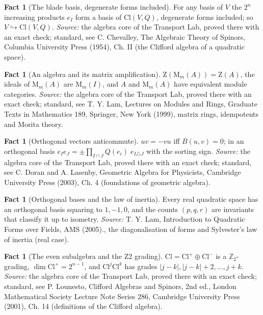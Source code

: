 \documentclass[11pt]{article}
\theoremstyle{definition}
\newtheorem{fact}[theorem]{Fact}
\theoremstyle{plain}
\providecommand{\Cl}{}\renewcommand{\Cl}{\mathrm{Cl}}
\providecommand{\Mat}{}\renewcommand{\Mat}{\mathrm{M}}
\providecommand{\Zc}{}\renewcommand{\Zc}{\mathrm{Z}}
\begin{document}
\begin{fact}[The blade basis, degenerate forms included]\label{c:std-algebra.blade-basis}
For any basis of $V$ the $2^{n}$ increasing products $e_I$ form a basis of $\Cl(V, Q)$, degenerate forms included; so $V \hookrightarrow \Cl(V, Q)$.
\emph{Source:} the algebra core of the Transport Lab, proved there with an exact check; standard, see C. Chevalley, The Algebraic Theory of Spinors, Columbia University Press (1954), Ch. II (the Clifford algebra of a quadratic space).
\end{fact}

\begin{fact}[An algebra and its matrix amplification]\label{c:std-algebra.morita-amplification}
$\Zc(\Mat_m(A)) = \Zc(A)$, the ideals of $\Mat_m(A)$ are $\Mat_m(I)$, and $A$ and $\Mat_m(A)$ have equivalent module categories.
\emph{Source:} the algebra core of the Transport Lab, proved there with an exact check; standard, see T. Y. Lam, Lectures on Modules and Rings, Graduate Texts in Mathematics 189, Springer, New York (1999), matrix rings, idempotents and Morita theory.
\end{fact}

\begin{fact}[Orthogonal vectors anticommute]\label{c:std-algebra.orthogonal-anticommute}
$uv = -vu$ iff $B(u,v) = 0$; in an orthogonal basis $e_I e_J = \pm \prod_{I \cap J} Q(e_i)\; e_{I \triangle J}$ with the sorting sign.
\emph{Source:} the algebra core of the Transport Lab, proved there with an exact check; standard, see C. Doran and A. Lasenby, Geometric Algebra for Physicists, Cambridge University Press (2003), Ch. 4 (foundations of geometric algebra).
\end{fact}

\begin{fact}[Orthogonal bases and the law of inertia]\label{c:std-algebra.sylvester-inertia}
Every real quadratic space has an orthogonal basis squaring to $1, -1, 0$, and the counts $(p, q, r)$ are invariants that classify it up to isometry.
\emph{Source:} T. Y. Lam, Introduction to Quadratic Forms over Fields, AMS (2005)., the diagonalisation of forms and Sylvester's law of inertia (real case).
\end{fact}

\begin{fact}[The even subalgebra and the Z2 grading]\label{c:std-algebra.z2-grading}
$\Cl = \Cl^{+} \oplus \Cl^{-}$ is a $\mathbb{Z}_2$-grading, $\dim \Cl^{+} = 2^{n-1}$, and $\Cl^{j}\Cl^{k}$ has grades $|j-k|, |j-k|+2, \dots, j+k$.
\emph{Source:} the algebra core of the Transport Lab, proved there with an exact check; standard, see P. Lounesto, Clifford Algebras and Spinors, 2nd ed., London Mathematical Society Lecture Note Series 286, Cambridge University Press (2001), Ch. 14 (definitions of the Clifford algebra).
\end{fact}
\end{document}
